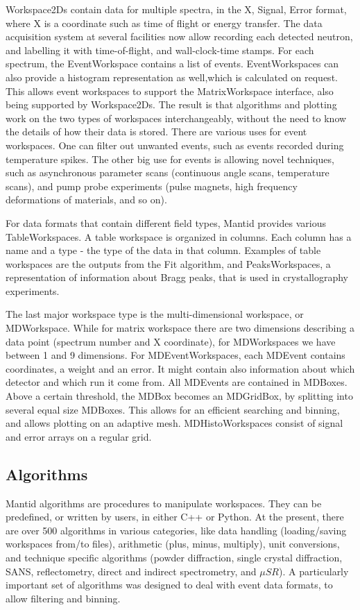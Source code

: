\documentclass{elsarticle}
\begin{document}
Workspace2Ds contain data for multiple spectra, in the X, Signal, Error format, where X is a coordinate such as time of flight or energy transfer. The data acquisition system at several facilities now allow recording each  detected neutron, and labelling it with time-of-flight, and wall-clock-time stamps. For each spectrum, the EventWorkspace contains a list of events. EventWorkspaces can also provide a histogram representation as well,which is calculated on request. This allows event workspaces to support the MatrixWorkspace interface, also being supported by Workspace2Ds. The result is that algorithms and plotting work on the two types of workspaces interchangeably, without the need to know the details of how their data is stored. 
There are various uses for event workspaces. One can filter out unwanted events, such as events recorded during temperature spikes. The other big use for events is allowing novel techniques, such as asynchronous parameter scans (continuous angle scans, temperature scans), and pump probe experiments (pulse magnets, high frequency deformations of materials, and so on).

For data formats that contain different field types, Mantid provides various TableWorkspaces. A table workspace is organized in columns. Each column has a name and a type - the type of the data in that column. Examples of table workspaces are the outputs from the Fit algorithm, and PeaksWorkspaces, a representation of information about Bragg peaks, that is used in crystallography experiments.
 
The last major workspace type is the multi-dimensional workspace, or MDWorkspace. While for matrix workspace there are two dimensions describing a data point (spectrum number and X coordinate), for MDWorkspaces we have between 1 and 9 dimensions. For MDEventWorkspaces, each MDEvent contains coordinates, a weight and an error. It might contain also information about which detector and which run it come from. All MDEvents are contained in MDBoxes. Above a certain threshold, the MDBox becomes an MDGridBox, by splitting into several equal size MDBoxes. This allows for an efficient searching and binning, and allows plotting on an adaptive mesh. MDHistoWorkspaces consist of signal and error arrays on a regular grid.  

\subsection{Algorithms}
Mantid algorithms are procedures to manipulate workspaces. They can be predefined, or written by users, in either C++ or Python. At the present, there are over 500 algorithms in various categories, like data handling (loading/saving workspaces from/to files), arithmetic (plus, minus, multiply), unit conversions, and technique specific algorithms (powder diffraction, single crystal diffraction, SANS, reflectometry, direct and indirect spectrometry, and $\mu SR$). A particularly important set of algorithms was designed to deal with event data formats, to allow filtering and binning.
\end{document}
